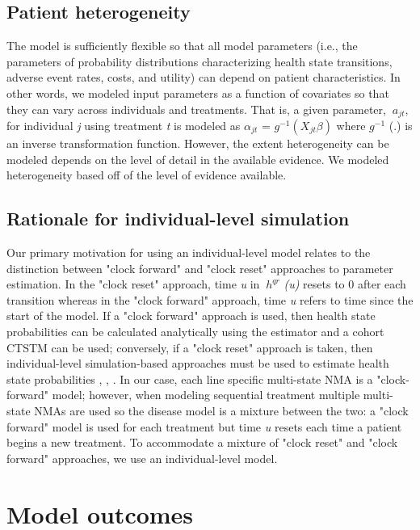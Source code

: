 \documentclass[11pt,final,fleqn]{article}\usepackage[]{graphicx}\usepackage[]{color}
\theoremstyle{plain}
\begin{document}
{\subsection{Patient heterogeneity}
The model is sufficiently flexible so that all model parameters (i.e., the parameters of probability distributions characterizing health state transitions, adverse event rates, costs, and utility) can depend on patient characteristics. In other words, we modeled input parameters as a function of covariates so that they can vary across individuals and treatments. That is, a given parameter, $\ a_{jt} $, for individual \textit{j} using treatment \textit{t} is modeled as $ \alpha_{jt} $ = $ \textit{g}^{-1} (X_{jt}\beta) $ where $ \textit{g}^{-1} $ (.) is an inverse transformation function. However, the extent heterogeneity can be modeled depends on the level of detail in the available evidence. We modeled heterogeneity based off of the level of evidence available. 

\subsection{Rationale for individual-level simulation}

Our primary motivation for using an individual-level model relates to the distinction between "clock forward" and "clock reset" approaches to parameter estimation. In the "clock reset" approach, time \textit{u} in $\ h^{qr} $ \textit{(u)} resets to 0 after each transition whereas in the "clock forward" approach, time \textit{u} refers to time since the start of the model. If a "clock forward" approach is used, then health state probabilities can be calculated analytically using the \citet{aalen1978empirical} estimator and a cohort CTSTM can be used; conversely, if a "clock reset" approach is taken, then individual-level simulation-based approaches must be used to estimate health state probabilities \citep{putter2007tutorial}, \citep{de2011mstate}, \citep{jackson2016flexsurv}. In our case, each line specific multi-state NMA is a "clock-forward" model; however, when modeling sequential treatment multiple multi-state NMAs are used so the disease model is a mixture between the two: a "clock forward" model is used for each treatment but time \textit{u} resets each time a patient begins a new treatment. To accommodate a mixture of "clock reset" and "clock forward" approaches, we use an individual-level model. 

\section{Model outcomes}\label{sec:model-outcomes}

}
\end{document}
